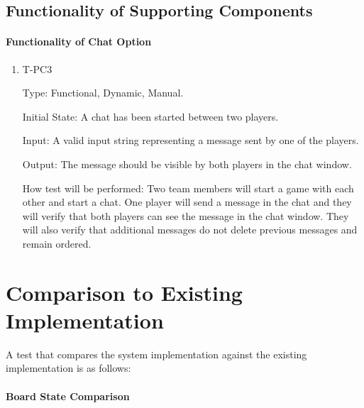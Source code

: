 \documentclass[12pt, titlepage]{article}
\begin{document}
\subsection{Functionality of Supporting Components}

    \paragraph{Functionality of Chat Option}
    
        \begin{enumerate}
        
            \item{T-PC3\\}
            
                Type: Functional, Dynamic, Manual.
                					
                Initial State: A chat has been started between two players.
                					
                Input: A valid input string representing a message sent by one of the players.
                					
                Output: The message should be visible by both players in the chat window.
                					
                How test will be performed: Two team members will start a game with each other and start a chat. One player will send a message in the chat and they will verify that both players can see the message in the chat window. They will also verify that additional messages do not delete previous messages and remain ordered.
				
        \end{enumerate}

	
\section{Comparison to Existing Implementation}	

A test that compares the system implementation against the existing implementation is as follows:

\paragraph{Board State Comparison}
    
\end{document}
